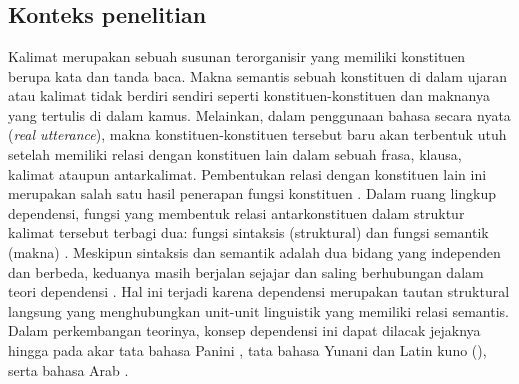 \chapter{\babDua}

\section{Konteks penelitian}
Kalimat merupakan sebuah susunan terorganisir yang memiliki konstituen berupa kata dan tanda baca. Makna semantis sebuah konstituen di dalam ujaran atau kalimat tidak berdiri sendiri seperti konstituen-konstituen dan maknanya yang tertulis di dalam kamus. Melainkan, dalam penggunaan bahasa secara nyata (\textit{real utterance}), makna konstituen-konstituen tersebut baru akan terbentuk utuh setelah memiliki relasi dengan konstituen lain dalam sebuah frasa, klausa, kalimat ataupun antarkalimat. Pembentukan relasi dengan konstituen lain ini merupakan salah satu hasil penerapan fungsi konstituen \citep{tesniere1959elements}. Dalam ruang lingkup dependensi, fungsi yang membentuk relasi antarkonstituen dalam struktur kalimat tersebut terbagi dua: fungsi sintaksis (struktural) dan fungsi semantik (makna) \citep{tesniere1959elements}. Meskipun sintaksis dan semantik adalah dua bidang yang independen dan berbeda, keduanya masih berjalan sejajar dan saling berhubungan dalam teori dependensi \citep{tesniere1959elements}. Hal ini terjadi karena dependensi merupakan tautan struktural langsung yang menghubungkan unit-unit linguistik yang memiliki relasi semantis. Dalam perkembangan teorinya, konsep dependensi ini dapat dilacak jejaknya hingga pada akar tata bahasa Panini \citep{bharati1995natural}, tata bahasa Yunani dan Latin kuno (\citealp{covington1984syntactic, percival1990reflections}), serta bahasa Arab \citep{owens1988foundations}. 

